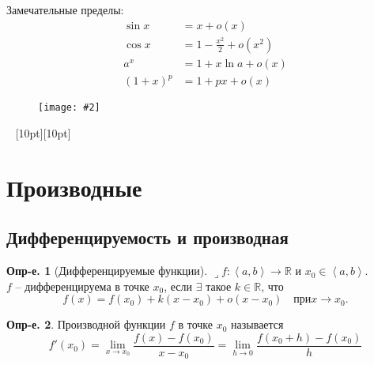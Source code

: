 \documentclass[a4paper,12pt]{article}
\numberwithin{figure}{section}
\newcommand\cfigure[2]{
	\begin{figure}[H] \centering \texttt{[image: \#2]} \end{figure}
}
\theoremstyle{definition}
\newtheorem{definition}{Опр-е.}[section]
\def\RR{\mathbb{R}}
\def\on{\!:}
\def\intab{\left<a,b\right>}
\def\lets{{\huge$\lrcorner$}\space}
\def\vignette{\vspace{48pt} \noindent \hrulefill~ \raisebox{-8pt}[10pt][10pt]{\Huge\ding{102}}~ \hrulefill}
\begin{document}
Замечательные пределы:
\begin{align*}
	   \sin x &= x + o(x)
	\\ \cos x &= 1 - \frac{x^2}2 + o(x^2)
	\\ a^x &= 1 + x \ln a + o(x)
	\\ (1+x)^p &= 1 + px + o(x)
\end{align*}

\cfigure{\linewidth}{small-o-test-1.png}


\vignette
\section{Производные}


\subsection{Дифференцируемость и производная}


\begin{definition}[Дифференцируемые функции]
	\lets $f\on\intab\to\RR$ и $x_0\in\intab$. \\
	$f$ -- дифференцируема в точке $x_0$, если $\exists$ такое $k\in\RR$, что
	\[ f(x) = f(x_0) + k(x-x_0) + o(x-x_0) \quad при x \to x_0. \]
\end{definition}


\begin{definition}
	Производной функции $f$ в точке $x_0$ называется
	\[ f'(x_0) = \lim_{x\to x_0}\frac{f(x)-f(x_0)}{x-x_0}
			   = \lim_{h\to 0}\frac{f(x_0+h)-f(x_0)}h \]
\end{definition}
\end{document}
